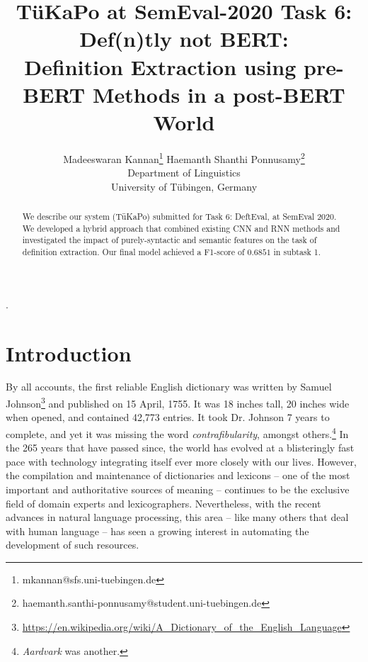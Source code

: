 \documentclass[11pt]{article}
\title{T\"uKaPo at SemEval-2020 Task 6: Def(n)tly not BERT:\\
Definition Extraction using pre-BERT Methods in a post-BERT World}
\author{Madeeswaran Kannan\thanks{\quad mkannan@sfs.uni-tuebingen.de} \qquad Haemanth Shanthi Ponnusamy\thanks{\quad haemanth.santhi-ponnusamy@student.uni-tuebingen.de}\\
	Department of Linguistics \\
	University of T\"ubingen, Germany \\}
\date{}
\begin{document}
\setlength{\parindent}{0pt}.

\maketitle
\begin{abstract}
  We describe our system (T\"{u}KaPo) submitted for Task 6: DeftEval, at SemEval 2020.
  We developed a hybrid approach that combined existing CNN and RNN methods and investigated
  the impact of purely-syntactic and semantic features on the task of definition extraction.
  Our final model achieved a F1-score of $0.6851$ in subtask 1.
\end{abstract}

\renewcommand*{\arraystretch}{1.2}


\section{Introduction}
By all accounts, the first reliable English dictionary was written by Samuel Johnson\footnote{\url{https://en.wikipedia.org/wiki/A_Dictionary_of_the_English_Language}} and published on 15 April, 1755. It was 18 inches tall, 20 inches wide when opened, and
contained 42,773 entries. It took Dr. Johnson 7 years to complete, and yet it was missing the word \emph{contrafibularity}, amongst others.\footnote{\emph{Aardvark} was another.} In the 265 years that have passed since, the world has evolved at a blisteringly fast
pace with technology integrating itself ever more closely with our lives. However, the compilation and maintenance of dictionaries and
lexicons -- one of the most important and authoritative sources of meaning -- continues to be the exclusive field of domain experts
and lexicographers. Nevertheless, with the recent advances in natural language processing, this area -- like many others that deal
with human language -- has seen a growing interest in automating the development of such resources.\\
\end{document}
